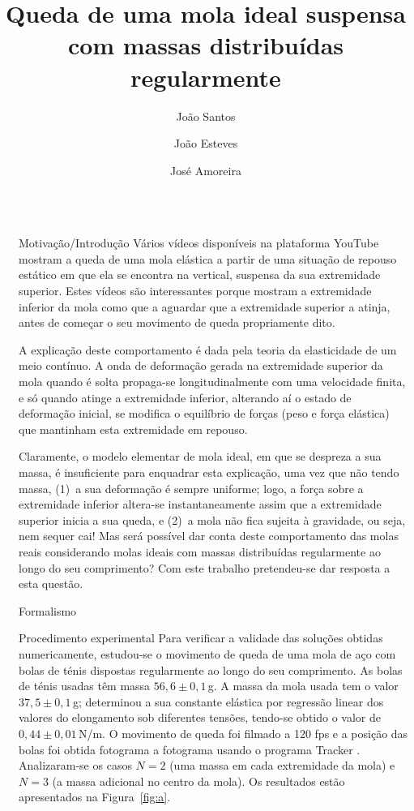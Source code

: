 \documentclass[final]{beamer}
\title{Queda de uma mola ideal suspensa com massas distribuídas regularmente}
\author{João Santos \inst{2} \and João Esteves \inst{2} \and José Amoreira \inst{1,2,3}}
\institute[]{\inst{1} Laboratório de Instrumentação e Física Experimental de Partículas \and  \inst{2}Universidade da Beira Interior  \samelineand \inst{3} Centro de Matemática e Aplicações (CMAUBI)}
\newlength{\sepwidth}
\newlength{\colwidth}
\newcommand{\separatorcolumn}{\begin{column}{\sepwidth}\end{column}}
\begin{document}
\begin{frame}[t]
\begin{columns}[t]
\separatorcolumn
\begin{column}{\colwidth}
\begin{exampleblock}{Motivação/Introdução}
  Vários vídeos disponíveis na plataforma YouTube mostram a queda de uma mola
  elástica a partir de uma situação de repouso estático em que ela se encontra
  na vertical, suspensa da sua extremidade superior. Estes vídeos são
  interessantes porque mostram a extremidade inferior da mola como que a aguardar
  que a extremidade superior a atinja, antes de começar o seu movimento de queda
  propriamente dito. 
	
  A explicação deste comportamento é dada pela teoria da elasticidade de um meio
  contínuo. A onda de deformação gerada na extremidade superior da mola quando é
  solta propaga-se longitudinalmente com uma velocidade finita, e só quando
  atinge a extremidade inferior, alterando aí o estado de deformação inicial, se
  modifica o equilíbrio de forças (peso e força elástica) que mantinham esta
  extremidade em repouso.
	
  Claramente, o modelo elementar de mola ideal, em que se despreza a sua massa,
  é insuficiente para enquadrar esta explicação, uma vez que não tendo massa,
  (1)~a sua deformação é sempre uniforme; logo, a força sobre a extremidade
  inferior altera-se instantaneamente assim que a extremidade superior inicia a
  sua queda, e (2)~a mola não fica sujeita à gravidade, ou seja, nem sequer cai!
  Mas será possível dar conta deste comportamento das molas reais considerando
  molas ideais com massas distribuídas regularmente ao longo do seu
  comprimento? Com este trabalho pretendeu-se dar resposta a esta questão.
\end{exampleblock}
\begin{block}{Formalismo}
	\vspace{1cm}
	
\end{block}
\begin{block}{Procedimento experimental}
Para verificar a validade das soluções obtidas numericamente, estudou-se o
movimento de queda de uma mola de aço com bolas de ténis dispostas
regularmente ao longo do seu comprimento.  As bolas de ténis usadas têm massa
$56,6\pm0,1$\,g.  A massa da mola usada tem o valor $37,5\pm0,1$\,g;
determinou a sua constante elástica por regressão linear dos valores do
elongamento sob diferentes tensões, tendo-se obtido o valor de
$0,44\pm0,01$\,N/m.  O movimento de queda foi filmado a 120 fps e a posição das
bolas foi obtida fotograma a fotograma usando o programa Tracker \cite{Tracker}.
Analizaram-se os casos $N=2$ (uma massa em cada extremidade da mola) e $N=3$ (a
massa adicional no centro da mola). Os resultados estão apresentados na
Figura~\ref{fig:a}.


\end{block}
\end{column}
\end{columns}
\end{frame}
\end{document}
